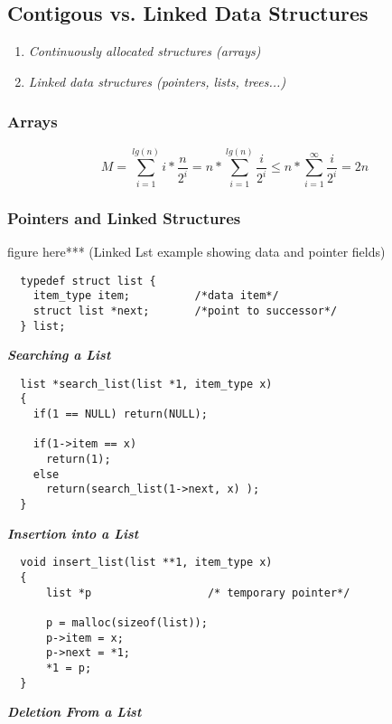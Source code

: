 \subsection{Contigous vs. Linked Data Structures}

\begin{enumerate}
	\item 
	  \emph{Continuously allocated structures (arrays)}
	\item 
	  \emph{Linked data structures (pointers, lists, trees...)}
\end{enumerate}

\subsubsection{Arrays}
$$M=\sum_{i=1}^{lg(n)} i*\frac{n}{2^{i}} = n*\sum_{i=1}^{lg(n)}\frac{i}{2^{i}} \leq n*\sum_{i=1}^{\infty}\frac{i}{2^{i}} = 2n$$

\subsubsection{Pointers and Linked Structures}

figure here*** (Linked Lst example showing data and pointer fields)

\begin{verbatim}
  typedef struct list {
    item_type item;          /*data item*/
    struct list *next;       /*point to successor*/
  } list;
\end{verbatim}

\textbf{ \emph{Searching a List} }\\

\begin{verbatim}
  list *search_list(list *1, item_type x)
  {
    if(1 == NULL) return(NULL);

    if(1->item == x)
      return(1);
    else
      return(search_list(1->next, x) );
  }
\end{verbatim}

\textbf{ \emph{Insertion into a List} }\\

\begin{verbatim}
  void insert_list(list **1, item_type x) 
  {
      list *p                  /* temporary pointer*/

      p = malloc(sizeof(list));
      p->item = x;
      p->next = *1;
      *1 = p;
  }
\end{verbatim}

\textbf{ \emph{Deletion From a List} }\\

